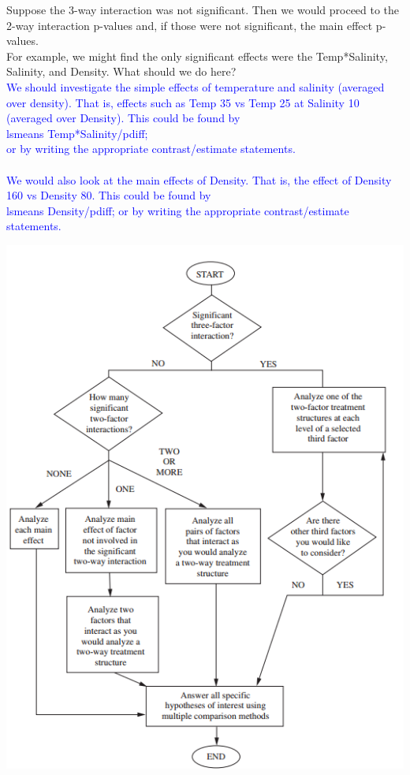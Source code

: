 Suppose the 3-way interaction was not significant. Then we would proceed to the 2-way interaction p-values and, if those were not significant, the main effect p-values.\\

For example, we might find the only significant effects were the Temp*Salinity, Salinity, and Density.  What should we do here?\\
\textcolor{blue}{We should investigate the simple effects of temperature and salinity (averaged over density).  That is, effects such as Temp 35 vs Temp 25 at Salinity 10 (averaged over Density).  This could be found by\\
lsmeans Temp*Salinity/pdiff;\\
or by writing the appropriate contrast/estimate statements.\\~\\
We would also look at the main effects of Density.  That is, the effect of Density 160 vs Density 80.  This could be found by\\
lsmeans Density/pdiff;
or by writing the appropriate contrast/estimate statements.
}

\includegraphics{flowchart}